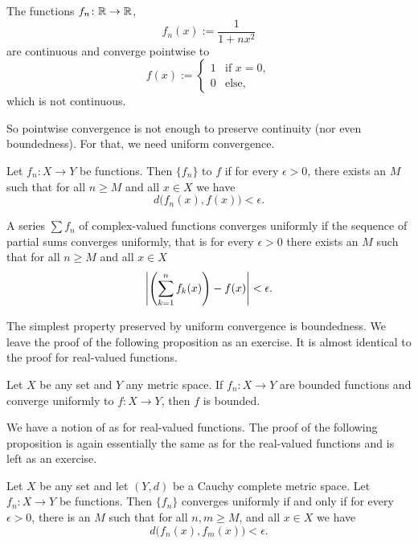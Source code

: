 \begin{example}
The functions $f_n \colon {\mathbb{R}} \to {\mathbb{R}}$,
\begin{equation*}
f_n(x) := \frac{1}{1+nx^2}
\end{equation*}
are continuous and converge pointwise to
\begin{equation*}
f(x) := 
\begin{cases}
1 & \text{if } x=0, \\
0 & \text{else,}
\end{cases}
\end{equation*}
which is not continuous.
\end{example}

So pointwise convergence is not enough to preserve continuity (nor even
boundedness).  For that, we need uniform convergence.

Let $f_n \colon X \to Y$ be functions.  Then
$\{f_n\}$ \emph{}
to $f$ if
for every $\epsilon > 0$, there exists an $M$ such that
for all $n \geq M$ and all $x \in X$ we have
\begin{equation*}
d\bigl(f_n(x),f(x)\bigr) < \epsilon .
\end{equation*}

A series $\sum f_n$ of complex-valued functions converges uniformly if the sequence of
partial sums converges uniformly, that is for every $\epsilon > 0$
there exists an $M$ such that
for all $n \geq M$ and all $x \in X$
\begin{equation*}
\left\lvert {\left(\sum_{k=1}^n f_k(x)\right)-f(x)} \right\rvert < \epsilon .
\end{equation*}

The simplest property preserved by uniform convergence is
boundedness.  We leave the proof of the following proposition as an
exercise.  It is almost identical to the proof for real-valued functions.

\begin{prop} \label{prop:uniformconvbounded}
Let $X$ be any set and $Y$ any metric space.
If $f_n \colon X \to Y$ are bounded functions and converge uniformly to $f
\colon X \to Y$, then $f$ is bounded.
\end{prop}

We have a notion of \emph{} as for
real-valued functions.  The proof of the following proposition is
again essentially the same as for the real-valued functions and 
is left as an exercise.

\begin{prop} \label{prop:unifcauchymetric}
Let $X$ be any set and let $(Y,d)$ be a Cauchy complete metric space.
Let $f_n \colon X \to Y$ be functions.  Then $\{ f_n \}$ converges
uniformly if and only if for every $\epsilon > 0$, there is an $M$ such that
for all $n, m \geq M$, and all $x \in X$ we have
\begin{equation*}
d\bigl(f_n(x),f_m(x)\bigr) < \epsilon .
\end{equation*}
\end{prop}

